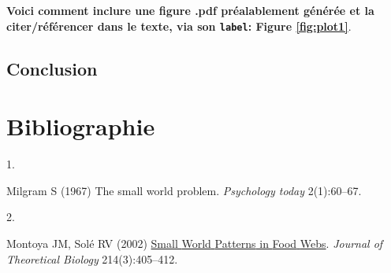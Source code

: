 \documentclass[9pt,twocolumn,twoside,]{pnas-new}
\newlength{\cslhangindent}
\newlength{\csllabelwidth}
\newlength{\cslentryspacingunit} %
\newenvironment{CSLReferences}[2] %
 {%
  \setlength{\parindent}{0pt}
  \ifodd #1
  \let\oldpar\par
  \def\par{\hangindent=\cslhangindent\oldpar}
  \fi
  \setlength{\parskip}{#2\cslentryspacingunit}
 }%
 {}
\newcommand{\CSLLeftMargin}[1]{\parbox[t]{\csllabelwidth}{#1}}
\newcommand{\CSLRightInline}[1]{\parbox[t]{\linewidth - \csllabelwidth}{#1}\break}
\begin{document}
\textbf{Voici comment inclure une figure .pdf préalablement générée et
la citer/référencer dans le texte, via son \texttt{label}: Figure
\ref{fig:plot1}}.

\hypertarget{conclusion}{%
\subsection{Conclusion}\label{conclusion}}

\newpage

\hypertarget{bibliographie}{%
\section*{Bibliographie}\label{bibliographie}}

\hypertarget{refs}{}
\begin{CSLReferences}{0}{0}
\leavevmode{}%
\CSLLeftMargin{1. }
\CSLRightInline{Milgram S (1967) The small world problem.
\emph{Psychology today} 2(1):60--67.}

\leavevmode{}%
\CSLLeftMargin{2. }
\CSLRightInline{Montoya JM, Solé RV (2002)
\href{https://doi.org/10.1006/jtbi.2001.2460}{Small {World} {Patterns}
in {Food} {Webs}}. \emph{Journal of Theoretical Biology}
214(3):405--412.}

\end{CSLReferences}



% 
\end{document}
